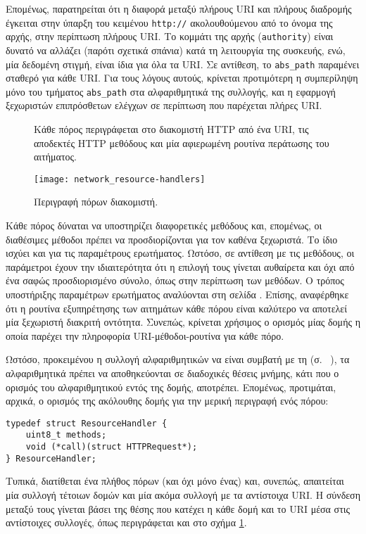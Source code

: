 Επομένως, παρατηρείται ότι η διαφορά μεταξύ πλήρους URI και πλήρους διαδρομής
έγκειται στην ύπαρξη του κειμένου \verb~http://~ ακολουθούμενου από το όνομα της
αρχής, στην περίπτωση πλήρους URI. Το κομμάτι της αρχής (\verb~authority~) είναι
δυνατό να αλλάζει (παρότι σχετικά σπάνια) κατά τη λειτουργία της συσκευής, ενώ,
μία δεδομένη στιγμή, είναι ίδια για όλα τα URI. Σε αντίθεση, το \verb~abs_path~
παραμένει σταθερό για κάθε URI. Για τους λόγους αυτούς, κρίνεται προτιμότερη η
συμπερίληψη μόνο του τμήματος \verb~abs_path~ στα αλφαριθμητικά της συλλογής,
και η εφαρμογή ξεχωριστών επιπρόσθετων ελέγχων σε περίπτωση που παρέχεται πλήρες
URI.

\begin{figure}
    \caption{Περιγραφή πόρων διακομιστή.
    \label{fig:network:resource-handlers}}
    Κάθε πόρος περιγράφεται στο διακομιστή HTTP από ένα URI, τις αποδεκτές HTTP
    μεθόδους και μία αφιερωμένη ρουτίνα περάτωσης του αιτήματος.
    \begin{center}
    \texttt{[image: network\_resource-handlers]}
    \end{center}
\end{figure}

Κάθε πόρος δύναται να υποστηρίζει διαφορετικές μεθόδους και, επομένως, οι
διαθέσιμες μέθοδοι πρέπει να προσδιορίζονται για τον καθένα ξεχωριστά. Το ίδιο
ισχύει και για τις παραμέτρους ερωτήματος. Ωστόσο, σε αντίθεση με τις μεθόδους,
οι παράμετροι έχουν την ιδιαιτερότητα ότι η επιλογή τους γίνεται αυθαίρετα και
όχι από ένα σαφώς προσδιορισμένο σύνολο, όπως στην περίπτωση των μεθόδων. Ο
τρόπος υποστήριξης παραμέτρων ερωτήματος αναλύονται στη σελίδα
\pageref{ssubsec:network:query-string}.
Επίσης, αναφέρθηκε ότι η ρουτίνα εξυπηρέτησης των αιτημάτων κάθε πόρου είναι
καλύτερο να αποτελεί μία ξεχωριστή διακριτή οντότητα. Συνεπώς, κρίνεται χρήσιμος
ο ορισμός μίας δομής η οποία παρέχει την πληροφορία URI-μέθοδοι-ρουτίνα για κάθε
πόρο.

Ωστόσο, προκειμένου η συλλογή αλφαριθμητικών να είναι συμβατή με τη
 (σ.~%
\pageref{ssubsec:network:stream-match}), τα αλφαριθμητικά πρέπει να
αποθηκεύονται σε διαδοχικές θέσεις μνήμης, κάτι που ο ορισμός του αλφαριθμητικού
εντός της δομής, αποτρέπει. Επομένως, προτιμάται, αρχικά, ο ορισμός της
ακόλουθης δομής για την μερική περιγραφή ενός πόρου:
\begin{lstlisting}
typedef struct ResourceHandler {
    uint8_t methods;
    void (*call)(struct HTTPRequest*);
} ResourceHandler;
\end{lstlisting}
Τυπικά, διατίθεται ένα πλήθος πόρων (και όχι μόνο ένας) και, συνεπώς, απαιτείται
μία συλλογή τέτοιων δομών και μία ακόμα συλλογή με τα αντίστοιχα URI. Η σύνδεση
μεταξύ τους γίνεται βάσει της θέσης που κατέχει η κάθε δομή και το URI μέσα στις
αντίστοιχες συλλογές, όπως περιγράφεται και στο σχήμα
\ref{fig:network:resource-handlers}.


